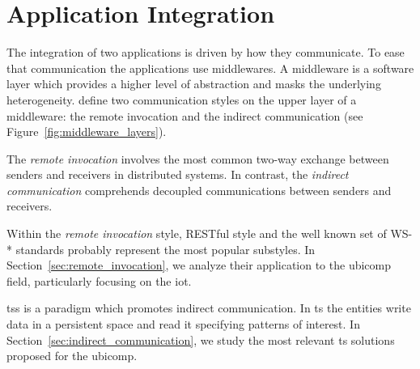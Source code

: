 \section{Application Integration}
\label{sec:integration}

%
%


The integration of two applications is driven by how they communicate.
To ease that communication the applications use middlewares.
A middleware is a software layer which provides a higher level of abstraction and masks the underlying heterogeneity.
\citet{coulouris_distributed_2012} define two communication styles on the upper layer of a middleware: %
the remote invocation and the indirect communication (see Figure~\ref{fig:middleware_layers}).



The \emph{remote invocation} involves the most common two-way exchange between senders and receivers in distributed systems.
In contrast, the \emph{indirect communication} comprehends decoupled communications between senders and receivers.


Within the \emph{remote invocation} style, RESTful style \citep{fielding_architectural_2000} and the well known set of WS-* \citep{alonso_web_2010} standards probably represent the most popular substyles.
In Section~\ref{sec:remote_invocation}, we analyze their application to the \ac{ubicomp} field, particularly focusing on the \ac{iot}.


\aclp{ts} is a paradigm which promotes indirect communication.
In \ac{ts} the entities write data in a persistent space and read it specifying patterns of interest.
In Section~\ref{sec:indirect_communication}, we study the most relevant \acl{ts} solutions proposed for the \acl{ubicomp}.



